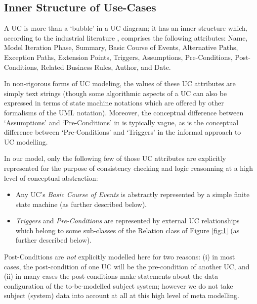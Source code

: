 \subsection{Inner Structure of Use-Cases}

A UC is more than a `bubble' in a UC diagram; it has an inner 
structure which, according to the industrial literature \cite{KGu04}, 
comprises the following attributes: Name, Model Iteration Phase, 
Summary, Basic Course of Events, Alternative Paths, Exception Paths, 
Extension Points, Triggers, Assumptions, Pre-Conditions, Post-Conditions, 
Related Business Rules, Author, and Date. 

In non-rigorous forms of UC modeling, the values of these UC attributes 
are simply text strings (though some algorithmic aspects of a UC can also 
be expressed in terms of state machine notations which are offered by other 
formalisms of the UML notation). Moreover, the conceptual difference between 
`Assumptions' and `Pre-Conditions' in \cite{KGu04} is typically vague, 
as is the conceptual difference between `Pre-Conditions' and `Triggers' 
in the informal approach to UC modelling. 

In our model, only the following few of those UC attributes are explicitly 
represented for the purpose of consistency checking and logic reasonning at 
a high level of conceptual abstraction:
\begin{itemize}
\item Any UC's \emph{Basic Course of Events} is abstractly represented 
      by a simple finite state machine (as further described below).
\item \emph{Triggers} and \emph{Pre-Conditions} are represented by 
      external UC relationships which belong to some sub-classes of 
      the Relation class of Figure \ref{fig:1} (as further described 
      below).
\end{itemize}
Post-Conditions are \emph{not} explicitly modelled here for two reasons: 
(i) in most cases, the post-condition of one UC will be the pre-condition 
of another UC, and (ii) in many cases the post-conditions make statements 
about the data configuration of the to-be-modelled subject system; however 
we do not take subject (system) data into account at all at this high level 
of meta modelling. 

